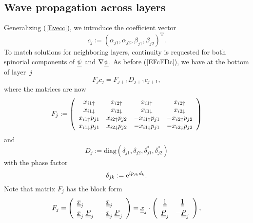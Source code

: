 \subsection{Wave propagation across layers}

Generalizing (\ref{Evecc}),
we introduce the coefficient vector
\begin{equation}
  c_j := {(\alpha_{j1}, \alpha_{j2}, \beta_{j1}, \beta_{j2})}^\text{T}.
\end{equation}
To match solutions for neighboring layers,
continuity is requested for both spinorial components
of $\underline{\psi}$ and $\mathbf{\nabla}\underline{\psi}$.
As before (\ref{EFcFDc}), we have at the bottom of layer~$j$
\begin{equation}\label{EFcFDcp}
  F_j c_j = F_{j+1} D_{j+1} c_{j+1},
\end{equation}
where the matrices are now
\begin{equation}
  F_j := \left(\begin{array}{cccc}
    x_{i1\uparrow}      &x_{i2\uparrow}     &x_{i1\uparrow}       &x_{i2\uparrow}       \\
    x_{i1\downarrow}      &x_{i2\downarrow}     &x_{i1\downarrow}       &x_{i2\downarrow}       \\
    x_{i1\uparrow}p_{j1}&x_{i2\uparrow}p_{j2}&-x_{i1\uparrow}p_{j1}&-x_{i2\uparrow}p_{j2}\\
    x_{i1\downarrow}p_{j1}&x_{i2\downarrow}p_{j2}&-x_{i1\downarrow}p_{j1}&-x_{i2\downarrow}p_{j2}
  \end{array}\right)
\end{equation}
and
\begin{equation}
  D_j := \text{diag}(\delta_{j1}, \delta_{j2}, \delta_{j1}^*, \delta_{j2}^*)
\end{equation}
with the phase factor
\begin{equation}
   \delta_{jk} := \text{e}^{ip_{jk}d_k}.
\end{equation}
Note that matrix $F_j$ has the block form
\begin{equation}
  F_j
  =\left(\begin{array}{ll}\underline{\underline{x}}_j&\hphantom{-}\underline{\underline{x}}_j\\[1ex]
    \underline{\underline{x}}_j\; \underline{\underline{P}}_j&-\underline{\underline{x}}_j\; \underline{\underline{P}}_j\end{array}\right)
    = \underline{\underline{x}}_j \cdot
    \left(\begin{array}{cc}\underline{\underline{1}}&\underline{\underline{1}}\\[1ex]
    \underline{\underline{P}}_j&-\underline{\underline{P}}_j\end{array}\right),
\end{equation}
